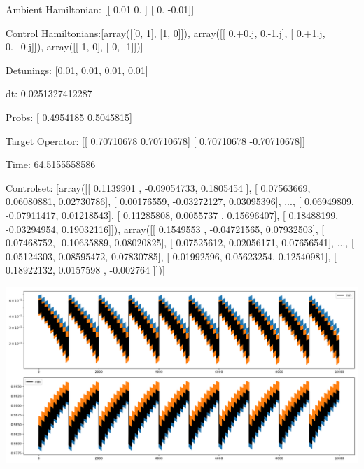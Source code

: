 \documentclass{article}
\begin{document}
    

\newpage

Ambient Hamiltonian: [[ 0.01  0.  ]
 [ 0.   -0.01]]

Control Hamiltonians:[array([[0, 1],
       [1, 0]]), array([[ 0.+0.j,  0.-1.j],
       [ 0.+1.j,  0.+0.j]]), array([[ 1,  0],
       [ 0, -1]])]

Detunings: [0.01, 0.01, 0.01, 0.01]

 dt: 0.0251327412287

Probs: [ 0.4954185  0.5045815]

Target Operator: [[ 0.70710678  0.70710678]
 [ 0.70710678 -0.70710678]]

Time: 64.5155558586

Controlset: [array([[ 0.1139901 , -0.09054733,  0.1805454 ],
       [ 0.07563669,  0.06080881,  0.02730786],
       [ 0.00176559, -0.03272127,  0.03095396],
       ..., 
       [ 0.06949809, -0.07911417,  0.01218543],
       [ 0.11285808,  0.0055737 ,  0.15696407],
       [ 0.18488199, -0.03294954,  0.19032116]]), array([[ 0.1549553 , -0.04721565,  0.07932503],
       [ 0.07468752, -0.10635889,  0.08020825],
       [ 0.07525612,  0.02056171,  0.07656541],
       ..., 
       [ 0.05124303,  0.08595472,  0.07830785],
       [ 0.01992596,  0.05623254,  0.12540981],
       [ 0.18922132,  0.0157598 , -0.002764  ]])]
\begin{center}
\includegraphics[scale=.9]{report_pickled_controls13/control_dpn_all}

\end{center}
\end{document}
